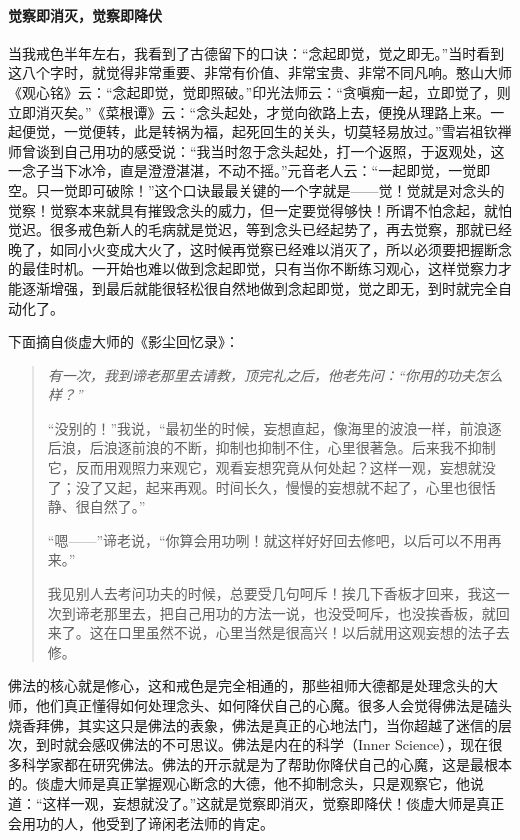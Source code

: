 \paragraph{觉察即消灭，觉察即降伏}

当我戒色半年左右，我看到了古德留下的口诀：“念起即觉，觉之即无。”当时看到这八个字时，就觉得非常重要、非常有价值、非常宝贵、非常不同凡响。憨山大师《观心铭》云：“念起即觉，觉即照破。”印光法师云：“贪嗔痴一起，立即觉了，则立即消灭矣。”《菜根谭》云：“念头起处，才觉向欲路上去，便挽从理路上来。一起便觉，一觉便转，此是转祸为福，起死回生的关头，切莫轻易放过。”雪岩祖钦禅师曾谈到自己用功的感受说：“我当时忽于念头起处，打一个返照，于返观处，这一念子当下冰冷，直是澄澄湛湛，不动不摇。”元音老人云：“一起即觉，一觉即空。只一觉即可破除！”这个口诀最最关键的一个字就是——觉！觉就是对念头的觉察！觉察本来就具有摧毁念头的威力，但一定要觉得够快！所谓不怕念起，就怕觉迟。很多戒色新人的毛病就是觉迟，等到念头已经起势了，再去觉察，那就已经晚了，如同小火变成大火了，这时候再觉察已经难以消灭了，所以必须要把握断念的最佳时机。一开始也难以做到念起即觉，只有当你不断练习观心，这样觉察力才能逐渐增强，到最后就能很轻松很自然地做到念起即觉，觉之即无，到时就完全自动化了。

下面摘自倓虚大师的《影尘回忆录》：

\begin{quotation}\it
    有一次，我到谛老那里去请教，顶完礼之后，他老先问：“你用的功夫怎么样？”

    “没别的！”我说，“最初坐的时候，妄想直起，像海里的波浪一样，前浪逐后浪，后浪逐前浪的不断，抑制也抑制不住，心里很著急。后来我不抑制它，反而用观照力来观它，观看妄想究竟从何处起？这样一观，妄想就没了；没了又起，起来再观。时间长久，慢慢的妄想就不起了，心里也很恬静、很自然了。”

    “嗯——”谛老说，“你算会用功咧！就这样好好回去修吧，以后可以不用再来。”

    我见别人去考问功夫的时候，总要受几句呵斥！挨几下香板才回来，我这一次到谛老那里去，把自己用功的方法一说，也没受呵斥，也没挨香板，就回来了。这在口里虽然不说，心里当然是很高兴！以后就用这观妄想的法子去修。
\end{quotation}

佛法的核心就是修心，这和戒色是完全相通的，那些祖师大德都是处理念头的大师，他们真正懂得如何处理念头、如何降伏自己的心魔。很多人会觉得佛法是磕头烧香拜佛，其实这只是佛法的表象，佛法是真正的心地法门，当你超越了迷信的层次，到时就会感叹佛法的不可思议。佛法是内在的科学（Inner Science），现在很多科学家都在研究佛法。佛法的开示就是为了帮助你降伏自己的心魔，这是最根本的。倓虚大师是真正掌握观心断念的大德，他不抑制念头，只是观察它，他说道：“这样一观，妄想就没了。”这就是觉察即消灭，觉察即降伏！倓虚大师是真正会用功的人，他受到了谛闲老法师的肯定。

